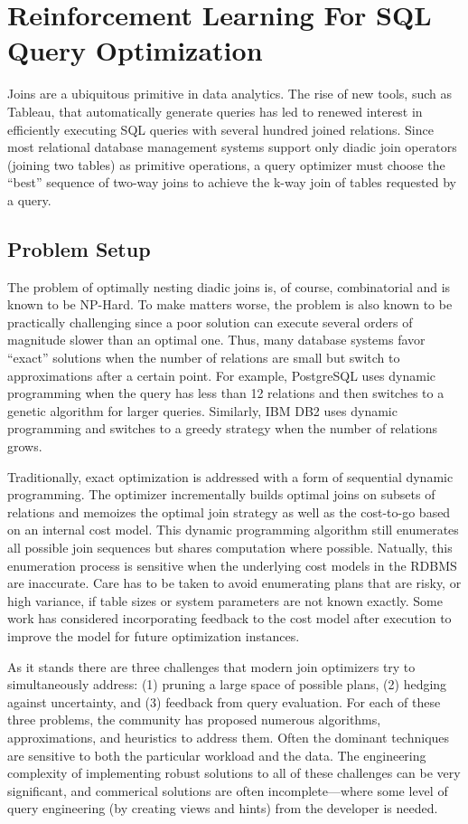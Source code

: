 \chapter{Reinforcement Learning For SQL Query Optimization}
Joins are a ubiquitous primitive in data analytics. 
The rise of new tools, such as Tableau, that automatically generate queries has led to renewed interest in efficiently executing SQL queries with several hundred joined relations.
Since most relational database management systems support only diadic join operators (joining two tables) as primitive operations, a query optimizer must choose the ``best'' sequence of two-way joins to achieve the k-way join of tables requested by a query. 

\section{Problem Setup}
The problem of optimally nesting diadic joins is, of course, combinatorial and is known to be NP-Hard.
To make matters worse, the problem is also known to be practically challenging since a poor solution can execute several orders of magnitude slower than an optimal one.
Thus, many database systems favor ``exact'' solutions when the number of relations are small but switch to approximations after a certain point.
For example, PostgreSQL uses dynamic programming when the query has less than 12 relations and
then switches to a genetic algorithm for larger queries. 
Similarly, IBM DB2 uses dynamic programming and switches to a greedy strategy when the number of relations grows.

Traditionally, exact optimization is addressed with a form of sequential dynamic programming. 
The optimizer incrementally builds optimal joins on subsets of relations and memoizes the optimal join strategy as well as the cost-to-go based on an internal cost model. 
This dynamic programming algorithm still enumerates all possible join sequences but shares computation where possible.
Natually, this enumeration process is sensitive when the underlying cost models in the RDBMS are inaccurate.
Care has to be taken to avoid enumerating plans that are risky, or high variance, if table sizes or system parameters are not known exactly.
Some work has considered incorporating feedback to the cost model after execution to improve the model for future optimization instances. 

As it stands there are three challenges that modern join optimizers try to simultaneously address: (1) pruning a large space of possible plans, (2) hedging against uncertainty, and (3) feedback from query evaluation. For each of these three problems, the community has proposed numerous algorithms, approximations, and heuristics to address them. Often the dominant techniques are sensitive to both the particular workload and the data. The engineering complexity of implementing robust solutions to all of these challenges can be very significant, and commerical solutions are often incomplete---where some level of query engineering (by creating views and hints) from the developer is needed.

